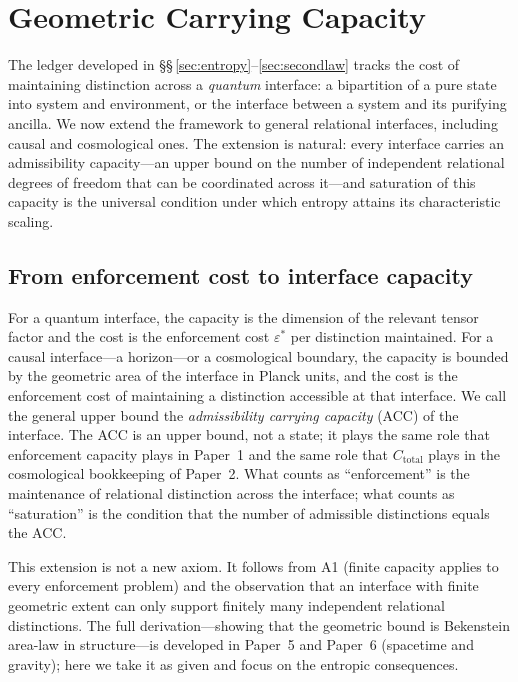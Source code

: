 \documentclass[11pt]{article}
\begin{document}
\section{Geometric Carrying Capacity}
\label{sec:gcc}

The ledger developed in \S\S\,\ref{sec:entropy}--\ref{sec:secondlaw} tracks
the cost of maintaining distinction across a \emph{quantum} interface: a
bipartition of a pure state into system and environment, or the interface
between a system and its purifying ancilla.  We now extend the framework to
general relational interfaces, including causal and cosmological ones.  The
extension is natural: every interface carries an admissibility capacity---an
upper bound on the number of independent relational degrees of freedom that
can be coordinated across it---and saturation of this capacity is the
universal condition under which entropy attains its characteristic scaling.

\subsection{From enforcement cost to interface capacity}
\label{subsec:gcc_cost_to_capacity}

For a quantum interface, the capacity is the dimension of the relevant
tensor factor and the cost is the enforcement cost $\varepsilon^*$ per
distinction maintained.  For a causal interface---a horizon---or a
cosmological boundary, the capacity is bounded by the geometric area of the
interface in Planck units, and the cost is the enforcement cost of
maintaining a distinction accessible at that interface.  We call the general
upper bound the \emph{admissibility carrying capacity} (ACC) of the
interface.  The ACC is an upper bound, not a state; it plays the same role
that enforcement capacity plays in Paper~1 and the same role that
$C_{\mathrm{total}}$ plays in the cosmological bookkeeping of Paper~2.
What counts as ``enforcement'' is the maintenance of relational distinction
across the interface; what counts as ``saturation'' is the condition that
the number of admissible distinctions equals the ACC.

This extension is not a new axiom.  It follows from A1 (finite capacity
applies to every enforcement problem) and the observation that an interface
with finite geometric extent can only support finitely many independent
relational distinctions.  The full derivation---showing that the geometric
bound is Bekenstein area-law in structure---is developed in Paper~5 and
Paper~6 (spacetime and gravity); here we take it as given and focus on the
entropic consequences.
\end{document}

